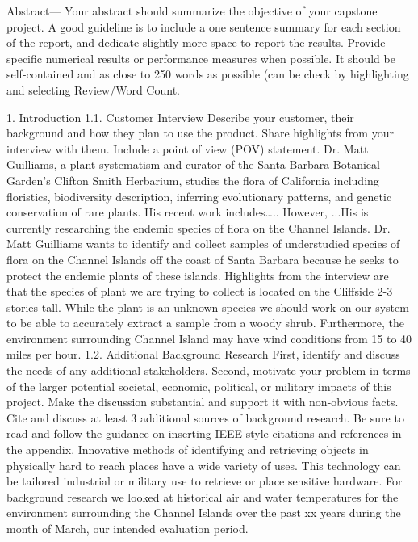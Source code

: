Abstract— Your abstract should summarize the objective of your capstone project.  A good guideline is to include a one sentence summary for each section of the report, and dedicate slightly more space to report the results.  Provide specific numerical results or performance measures when possible.  It should be self-contained and as close to 250 words as possible (can be check by highlighting and selecting Review/Word Count. 

    1. Introduction
        1.1. Customer Interview
Describe your customer, their background and how they plan to use the product.   Share highlights from your interview with them.   Include a point of view (POV) statement. 
Dr. Matt Guilliams, a plant systematism and curator of the Santa Barbara Botanical Garden's Clifton Smith Herbarium, studies the flora of California including floristics, biodiversity description, inferring evolutionary patterns, and genetic conservation of rare plants. His recent work includes…..  However, ...His is currently researching the endemic species of flora on the Channel Islands.
Dr. Matt Guilliams wants to identify and collect samples of understudied species of flora on the Channel Islands off the coast of Santa Barbara because he seeks to protect the endemic plants of these islands.
Highlights from the interview are that the species of plant we are trying to collect is located on the Cliffside 2-3 stories tall. While the plant is an unknown species we should work on our system to be able to accurately extract a sample from a woody shrub. Furthermore, the environment surrounding Channel Island may have wind conditions from 15 to 40 miles per hour.
        1.2. Additional Background Research
First, identify and discuss the needs of any additional stakeholders. Second, motivate your problem in terms of the larger potential societal, economic, political, or military impacts of this project.  Make the discussion substantial and support it with non-obvious facts.  Cite and discuss at least 3 additional sources of background research.  Be sure to read and follow the guidance on inserting IEEE-style citations and references in the appendix. 
Innovative methods of identifying and retrieving objects in physically hard to reach places have a wide variety of uses. This technology can be tailored industrial or military use to retrieve or place sensitive hardware. 
For background research we looked at historical air and water temperatures for the environment surrounding the Channel Islands over the past xx years during the month of March, our intended evaluation period.  

